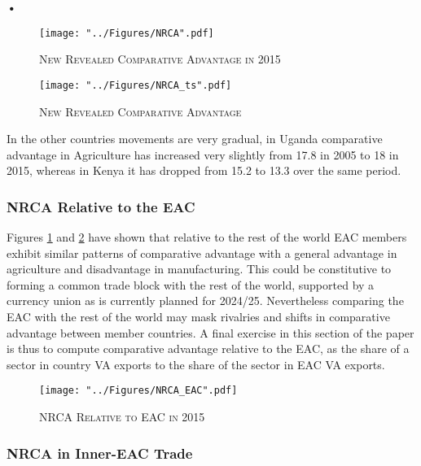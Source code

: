 \textbf{\textbf{•}}\documentclass[a4paper]{article}
\begin{document}
\begin{figure}[h!]
\centering
\caption{\label{fig:NRCA}\textsc{New Revealed Comparative Advantage in 2015}}
\texttt{[image: "../Figures/NRCA".pdf]} %
\end{figure}
\FloatBarrier


\begin{figure}[h!]
\centering
\caption{\label{fig:NRCA_ts}\textsc{New Revealed Comparative Advantage}}
\texttt{[image: "../Figures/NRCA\_ts".pdf]} %
\end{figure}
\FloatBarrier

In the other countries movements are very gradual, in Uganda comparative advantage in Agriculture has increased very slightly from 17.8 in 2005 to 18 in 2015, whereas in Kenya it has dropped from 15.2 to 13.3 over the same period. 


\subsubsection{NRCA Relative to the EAC}
Figures \ref{fig:NRCA} and \ref{fig:NRCA_ts} have shown that relative to the rest of the world EAC members exhibit similar patterns of comparative advantage with a general advantage in agriculture and disadvantage in manufacturing. This could be constitutive to forming a common trade block with the rest of the world, supported by a currency union as is currently planned for 2024/25. Nevertheless comparing the EAC with the rest of the world may mask rivalries and shifts in comparative advantage between member countries. A final exercise in this section of the paper is thus to compute comparative advantage relative to the EAC, as the share of a sector in country VA exports to the share of the sector in EAC VA exports. 


\begin{figure}[h!]
\centering
\caption{\label{fig:NRCA_EAC}\textsc{NRCA Relative to EAC in 2015}}
\texttt{[image: "../Figures/NRCA\_EAC".pdf]} %
\end{figure}
\FloatBarrier

\subsubsection{NRCA in Inner-EAC Trade}
\end{document}
